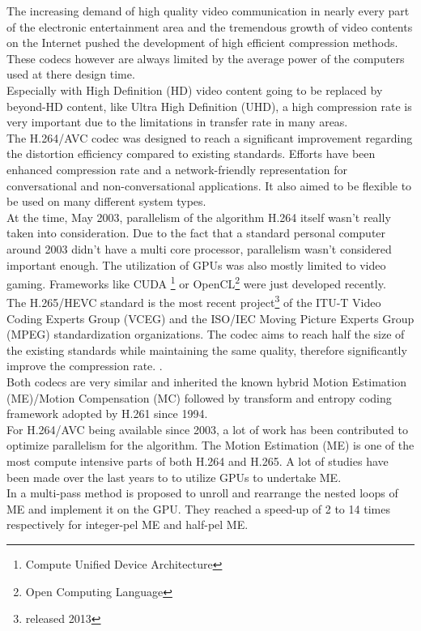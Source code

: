 The increasing demand of high quality video communication in nearly every part of the electronic entertainment area and the tremendous growth of video contents on the Internet pushed the development of high efficient compression methods. These codecs however are always limited by the average power of the computers used at there design time. \\
Especially with High Definition (HD) video content going to be replaced by beyond-HD content, like Ultra High Definition (UHD), a high compression rate is very important due to the limitations in transfer rate in many areas.\\
The H.264/AVC \cite{H264_Overview} codec was designed to reach a significant improvement regarding the distortion efficiency compared to existing standards. Efforts have been enhanced compression rate and a network-friendly representation for conversational and non-conversational applications. It also aimed to be flexible to be used on many different system types.\\
At the time, May 2003, parallelism of the algorithm H.264 itself wasn't really taken into consideration. Due to the fact that a standard personal computer around 2003 didn't have a multi core processor, parallelism wasn't considered important enough. The utilization of GPUs was also mostly limited to video gaming. Frameworks like CUDA \footnote{Compute Unified Device Architecture} or OpenCL\footnote{Open Computing Language} were just developed recently.\\
The H.265/HEVC \cite{H265_Overview} standard is the most recent project\footnote{released 2013} of the ITU-T Video Coding Experts Group (VCEG) and the ISO/IEC Moving
Picture Experts Group (MPEG) standardization organizations. The codec aims to reach half the size of the existing standards while maintaining the same quality, therefore significantly improve the compression rate. .\\
Both codecs are very similar and inherited the known hybrid Motion Estimation (ME)/Motion Compensation (MC) followed by transform and entropy coding framework adopted by H.261 \cite{H261_Overview} since 1994.\\

For H.264/AVC being available since 2003, a lot of work has been contributed to optimize parallelism for the algorithm. The Motion Estimation (ME) is one of the most compute intensive parts of both H.264 and H.265. A lot of studies have been made over the last years to  to utilize GPUs to undertake ME. \\
In \cite{ME1} a multi-pass method is proposed to unroll and rearrange the nested loops of ME and implement it on the GPU. They reached a speed-up of 2 to 14 times respectively for integer-pel ME and half-pel ME.\\

